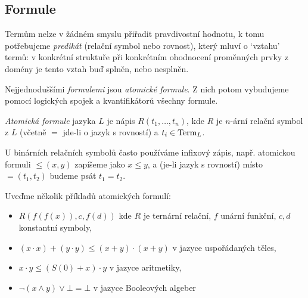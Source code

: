 \subsection{Formule}

Termům nelze v žádném smyslu přiřadit pravdivostní hodnotu, k tomu potřebujeme \emph{predikát} (relační symbol nebo rovnost), který mluví o `vztahu' termů: v konkrétní struktuře při konkrétním ohodnocení proměnných prvky z domény je tento vztah buď splněn, nebo nesplněn. 

Nejjednoduššími \emph{formulemi} jsou \emph{atomické formule}. Z nich potom vybudujeme pomocí logických spojek a kvantifikátorů všechny formule.


\begin{definition}
    \emph{Atomická formule} jazyka $L$ je nápis $R(t_1,\dots,t_n)$, kde $R$ je $n$-ární relační symbol z $L$ (včetně $=$ jde-li o jazyk s rovností) a $t_i\in\operatorname{Term}_L$. %
\end{definition}

U binárních relačních symbolů často používáme infixový zápis, např. atomickou formuli $\leq(x,y)$ zapíšeme jako $x\leq y$, a (je-li jazyk s rovností) místo $=(t_1,t_2)$ budeme psát $t_1=t_2$.

\begin{example}
    Uveďme několik příkladů atomických formulí:
    \begin{itemize}
        \item $R(f(f(x)),c, f(d))$ kde $R$ je ternární relační, $f$ unární funkční, $c,d$ konstantní symboly,
        \item $(x\cdot x)+(y\cdot y)\leq (x+y)\cdot(x+y)$ v jazyce uspořádaných těles,
        \item $x\cdot y\leq (S(0)+x)\cdot y$ v jazyce aritmetiky,
        \item $\neg(x\land y)\lor\bot=\bot$ v jazyce Booleových algeber        
    \end{itemize}
\end{example}


